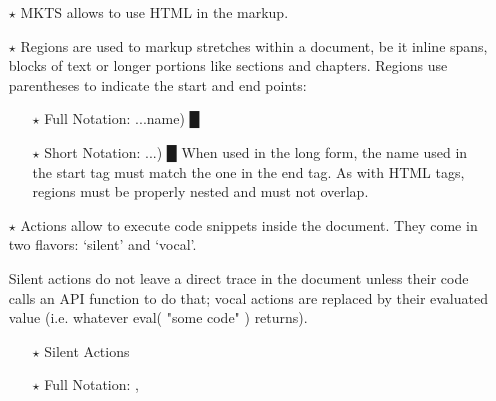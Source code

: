 \begin{itemize}\item[$\star$] MKTS allows to use {\mktsStyleBold{}HTML} in the markup.\mktsShowpar\par

\item[$\star$] {\mktsStyleBold{}Regions} are used to markup stretches within a document,
be it inline spans, blocks of text or longer portions like
sections and chapters. Regions use parentheses to indicate
the start and end points:\mktsShowpar\par
\begin{itemize}\item[$\star$] Full Notation: {...{\mktsStyleBold\color{violet}{%
\mktsStyleSymbol}name) {\mktsStyleSymbol█}}}\mktsShowpar\par

\item[$\star$] Short Notation: {...{\mktsStyleBold\color{violet}{%
\mktsStyleSymbol}) {\mktsStyleSymbol█}}}
When used in the long form,
the name used in the start tag must match the one in the end tag.
As with HTML tags, regions must be properly nested and must
not overlap.\mktsShowpar\par

\end{itemize}
\item[$\star$] {\mktsStyleBold{}Actions} allow to execute code snippets inside the document. They
come in two flavors: ‘silent’ and ‘vocal’.\mktsShowpar\par
Silent actions do not
leave a direct trace in the document unless their code calls an
API function to do that; vocal actions are replaced by their
evaluated value (i.e. whatever {\mktsStyleCode{}eval( "some code" )} returns).
\mktsShowpar\par
\begin{itemize}\item[$\star$] {\mktsStyleBold{}Silent Actions}\mktsShowpar\par

\item[$\star$] Full Notation: {}, {}\mktsShowpar\par


\end{itemize}
\end{itemize}
